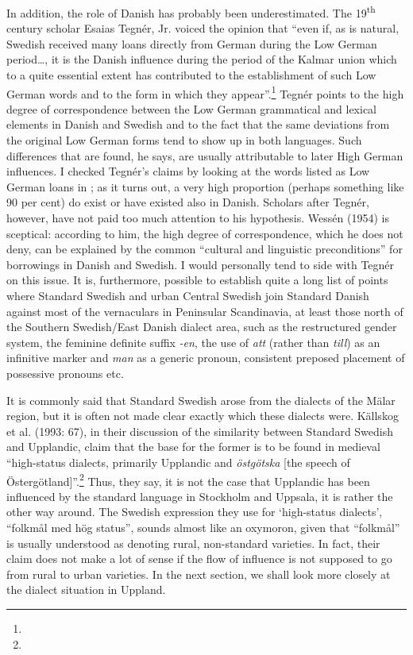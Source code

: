 \begin{styleBodytextC}
In addition, the role of Danish has probably been underestimated. The 19\textsuperscript{th} century scholar Esaias Tegnér, Jr. voiced the opinion that “even if, as is natural, Swedish received many loans directly from German during the Low German period…, it is the Danish influence during the period of the Kalmar union which to a quite essential extent has contributed to the establishment of such Low German words and to the form in which they appear”.\footnote{} Tegnér points to the high degree of correspondence between the Low German grammatical and lexical elements in Danish and Swedish and to the fact that the same deviations from the original Low German forms tend to show up in both languages. Such differences that are found, he says, are usually attributable to later High German influences. I checked Tegnér’s claims by looking at the words listed as Low German loans in \citet{Hellquist1922}; as it turns out, a very high proportion (perhaps something like 90 per cent) do exist or have existed also in Danish. Scholars after Tegnér, however, have not paid too much attention to his hypothesis. Wessén (1954) is sceptical: according to him, the high degree of correspondence, which he does not deny, can be explained by the common “cultural and linguistic preconditions” for borrowings in Danish and Swedish. I would personally tend to side with Tegnér on this issue. It is, furthermore, possible to establish quite a long list of points where Standard Swedish and urban Central Swedish join Standard Danish against most of the vernaculars in Peninsular Scandinavia, at least those north of the Southern Swedish/East Danish dialect area, such as the restructured gender system, the feminine definite suffix\textit{ -}\textit{en}, the use of \textit{att} (rather than \textit{till}) as an infinitive marker and \textit{man} as a generic pronoun, consistent preposed placement of possessive pronouns etc. 

\end{styleBodytextC}

\begin{styleBodytextC}
It is commonly said that Standard Swedish arose from the dialects of the Mälar region, but it is often not made clear exactly which these dialects were. Källskog et al. (1993: 67), in their discussion of the similarity between Standard Swedish and Upplandic, claim that the base for the former is to be found in medieval “high-status dialects, primarily Upplandic and \textit{östgötska} [the speech of Östergötland]”.\footnote{} Thus, they say, it is not the case that Upplandic has been influenced by the standard language in Stockholm and Uppsala, it is rather the other way around. The Swedish expression they use for ‘high-status dialects’, “folkmål med hög status”, sounds almost like an oxymoron, given that “folkmål” is usually understood as denoting rural, non-standard varieties. In fact, their claim does not make a lot of sense if the flow of influence is not supposed to go from rural to urban varieties. In the next section, we shall look more closely at the dialect situation in Uppland.

\end{styleBodytextC}

